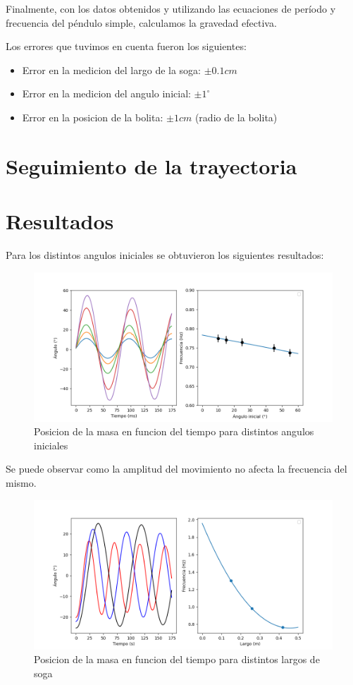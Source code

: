 \documentclass[12pt,a4]{article}
\begin{document}
Finalmente, con los datos obtenidos y utilizando las ecuaciones de período y frecuencia del péndulo simple, calculamos la gravedad efectiva.


Los errores que tuvimos en cuenta fueron los siguientes:

\begin{itemize}
    \item Error en la medicion del largo de la soga: $\pm 0.1 cm$
    \item Error en la medicion del angulo inicial: $\pm 1^\circ$
    \item Error en la posicion de la bolita: $\pm 1 cm$ (radio de la bolita)
\end{itemize}

\section{Seguimiento de la trayectoria}



\section{Resultados}

Para los distintos angulos iniciales se obtuvieron los siguientes resultados:

\begin{figure}[H]
    \centering
    \includegraphics[width=0.6\linewidth]{angulos.png}
    \caption{Posicion de la masa en funcion del tiempo para distintos angulos iniciales}
    \label{fig:angulos}
\end{figure}

Se puede observar como la amplitud del movimiento no afecta la frecuencia del mismo. 

\begin{figure}[H]
    \centering
    \includegraphics[width=0.6\linewidth]{largo.png}
    \caption{Posicion de la masa en funcion del tiempo para distintos largos de soga}
    \label{fig:largo}
\end{figure}
\end{document}
